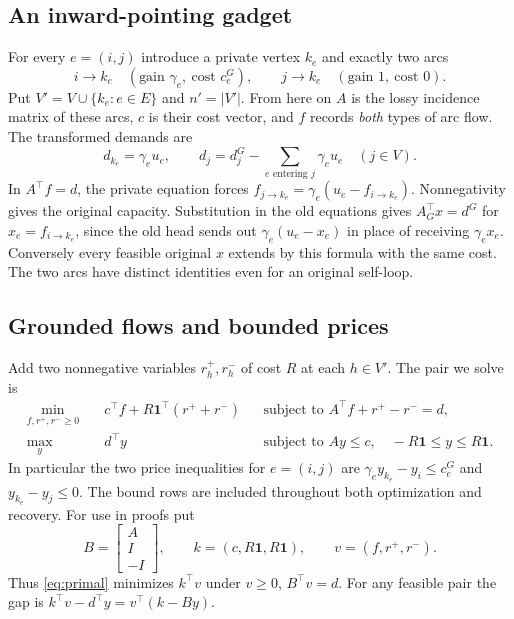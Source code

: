 \documentclass[11pt,letterpaper]{article}
\begin{document}
\subsection{An inward-pointing gadget}
For every $e=(i,j)$ introduce a private vertex $k_e$ and exactly two arcs
\[
 i\longrightarrow k_e\quad(\text{gain }\gamma_e,\ \text{cost }c^G_e),
 \qquad
 j\longrightarrow k_e\quad(\text{gain }1,\ \text{cost }0).
\]
Put $V'=V\cup\{k_e:e\in E\}$ and $n'=|V'|$. From here on $A$ is the
lossy incidence matrix of these arcs, $c$ is their cost vector, and $f$ records
\emph{both} types of arc flow. The transformed demands are
\[
 d_{k_e}=\gamma_e u_e,\qquad
 d_j=d^G_j-\sum_{e\text{ entering }j}\gamma_e u_e\quad(j\in V).
\]
In $A^\top f=d$, the private equation forces
$f_{j\to k_e}=\gamma_e(u_e-f_{i\to k_e})$. Nonnegativity gives the original
capacity. Substitution in the old equations gives $A_G^\top x=d^G$ for
$x_e=f_{i\to k_e}$, since the old head sends out
$\gamma_e(u_e-x_e)$ in place of receiving $\gamma_e x_e$. Conversely every
feasible original $x$ extends by this formula with the same cost. The two arcs
have distinct identities even for an original self-loop.

\subsection{Grounded flows and bounded prices}
Add two nonnegative variables $r_h^+,r_h^-$ of cost $R$ at each $h\in V'$.
The pair we solve is
\begin{align}
 \min_{f,r^+,r^-\ge0}\quad
   &c^\top f+R\mathbf1^\top(r^++r^-)
   &&\text{subject to }A^\top f+r^+-r^-=d, \tag{P}\label{eq:primal}\\
 \max_y\quad &d^\top y
   &&\text{subject to }Ay\le c,\quad -R\mathbf1\le y\le R\mathbf1.
   \tag{D}\label{eq:dual}
\end{align}
In particular the two price inequalities for $e=(i,j)$ are
$\gamma_e y_{k_e}-y_i\le c^G_e$ and $y_{k_e}-y_j\le0$.
The bound rows are included throughout both optimization and recovery.
For use in proofs put
\[
 B=\begin{bmatrix}A\\I\\-I\end{bmatrix},\qquad
 k=(c,R\mathbf1,R\mathbf1),\qquad v=(f,r^+,r^-).
\]
Thus \eqref{eq:primal} minimizes $k^\top v$ under $v\ge0$, $B^\top v=d$.
For any feasible pair the gap is $k^\top v-d^\top y=v^\top(k-By)$.
\end{document}

